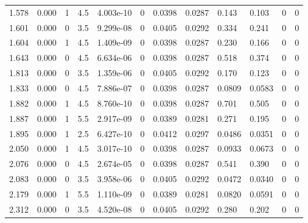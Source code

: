 \documentclass[preview]{standalone}
\begin{document}
{{\begin{tabular}{L{1.2cm}C{1.2cm} C{0.3cm}C{0.5cm} C{1.4cm}C{1.4cm} C{1.4cm}C{1.4cm} C{1.6cm}C{1.6cm} C{1.6cm}C{1.6cm}}
  1.578  &  0.000  & 1     & 4.5 &  4.003e-10  & 0  &  0.0398&   0.0287& 0.143 & 0.103   &  0 & 0  \\ 
  1.601  &  0.000  & 0     & 3.5 &  9.299e-08  & 0  &  0.0405&   0.0292& 0.334 & 0.241   &  0 & 0  \\ 
  1.604  &  0.000  & 1     & 4.5 &  1.409e-09  & 0  &  0.0398&   0.0287& 0.230 & 0.166   &  0 & 0  \\ 
  1.643  &  0.000  & 0     & 4.5 &  6.634e-06  & 0  &  0.0398&   0.0287& 0.518 & 0.374   &  0 & 0  \\ 
  1.813  &  0.000  & 0     & 3.5 &  1.359e-06  & 0  &  0.0405&   0.0292& 0.170 & 0.123   &  0 & 0  \\ 
  1.833  &  0.000  & 0     & 4.5 &  7.886e-07  & 0  &  0.0398&   0.0287& 0.0809 & 0.0583   &  0 & 0  \\ 
  1.882  &  0.000  & 1     & 4.5 &  8.760e-10  & 0  &  0.0398&   0.0287& 0.701 & 0.505   &  0 & 0  \\ 
  1.887  &  0.000  & 1     & 5.5 &  2.917e-09  & 0  &  0.0389&   0.0281& 0.271 & 0.195   &  0 & 0  \\ 
  1.895  &  0.000  & 1     & 2.5 &  6.427e-10  & 0  &  0.0412&   0.0297& 0.0486 & 0.0351   &  0 & 0  \\ 
  2.050  &  0.000  & 1     & 4.5 &  3.017e-10  & 0  &  0.0398&   0.0287& 0.0933 & 0.0673   &  0 & 0  \\ 
  2.076  &  0.000  & 0     & 4.5 &  2.674e-05  & 0  &  0.0398&   0.0287& 0.541 & 0.390   &  0 & 0  \\ 
  2.083  &  0.000  & 0     & 3.5 &  3.958e-06  & 0  &  0.0405&   0.0292& 0.0472 & 0.0340   &  0 & 0  \\ 
  2.179  &  0.000  & 1     & 5.5 &  1.110e-09  & 0  &  0.0389&   0.0281& 0.0820 & 0.0591   &  0 & 0  \\ 
  2.312  &  0.000  & 0     & 3.5 &  4.520e-08  & 0  &  0.0405&   0.0292& 0.280 & 0.202   &  0 & 0  \\ 
\hline 
\end{tabular} 

}}
\end{document}
